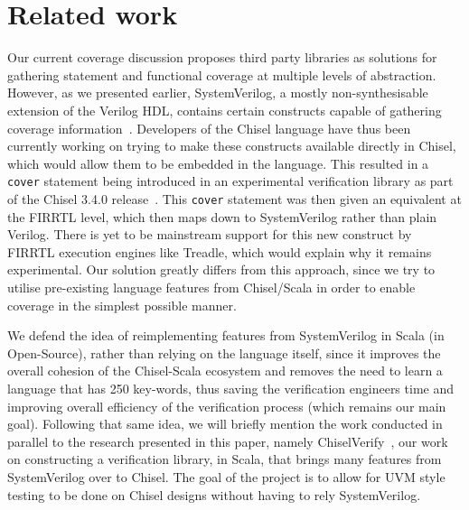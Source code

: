 \documentclass[conference]{IEEEtran}
\begin{document}
\section{Related work}
Our current coverage discussion proposes third party libraries  as solutions for gathering statement and functional coverage at multiple levels of abstraction. However, as we presented earlier, SystemVerilog, a mostly non-synthesisable extension of the Verilog HDL, contains certain constructs capable of gathering coverage information~\cite{spear2008systemverilog}. Developers of the Chisel language have thus been currently working on trying to make these constructs available directly in Chisel, which would allow them to be embedded in the language. This resulted in a \texttt{cover} statement being introduced in an experimental verification library as part of the Chisel 3.4.0 release~\cite{chisel3.4release_notes}. This \texttt{cover} statement was then given an equivalent at the FIRRTL level, which then maps down to SystemVerilog rather than plain Verilog. There is yet to be mainstream support for this new construct by FIRRTL execution engines like Treadle, which would explain why it remains experimental. Our solution greatly differs from this approach, since we try to utilise pre-existing language features from Chisel/Scala in order to enable coverage in the simplest possible manner. 

We defend the idea of reimplementing features from SystemVerilog in Scala (in Open-Source), rather than relying on the language itself, since it improves the overall cohesion of the Chisel-Scala ecosystem and removes the need to learn a language that has 250 key-words, thus saving the verification engineers time and improving overall efficiency of the verification process (which remains our main goal). Following that same idea, we will briefly mention the work conducted in parallel to the research presented in this paper, namely ChiselVerify~\cite{chiselverify}, our work on constructing a verification library, in Scala, that brings many features from SystemVerilog over to Chisel. The goal of the project is to allow for UVM style testing to be done on Chisel designs without having to rely SystemVerilog. 
\end{document}

